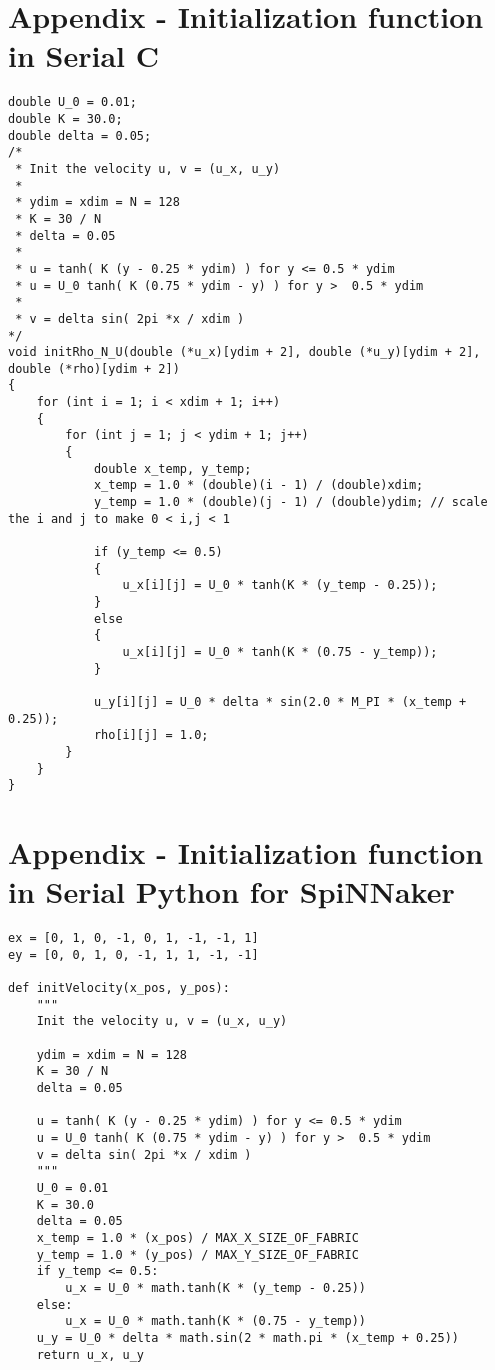 \appendix
\section{Appendix - Initialization function in Serial C} \label{app:a}
\begin{verbatim}
double U_0 = 0.01;
double K = 30.0;
double delta = 0.05;
/*
 * Init the velocity u, v = (u_x, u_y)
 * 
 * ydim = xdim = N = 128
 * K = 30 / N
 * delta = 0.05
 * 
 * u = tanh( K (y - 0.25 * ydim) ) for y <= 0.5 * ydim 
 * u = U_0 tanh( K (0.75 * ydim - y) ) for y >  0.5 * ydim
 * 
 * v = delta sin( 2pi *x / xdim )
*/
void initRho_N_U(double (*u_x)[ydim + 2], double (*u_y)[ydim + 2], double (*rho)[ydim + 2])
{
    for (int i = 1; i < xdim + 1; i++)
    {
        for (int j = 1; j < ydim + 1; j++)
        {
            double x_temp, y_temp;
            x_temp = 1.0 * (double)(i - 1) / (double)xdim;
            y_temp = 1.0 * (double)(j - 1) / (double)ydim; // scale the i and j to make 0 < i,j < 1

            if (y_temp <= 0.5)
            {
                u_x[i][j] = U_0 * tanh(K * (y_temp - 0.25));
            }
            else
            {
                u_x[i][j] = U_0 * tanh(K * (0.75 - y_temp));
            }

            u_y[i][j] = U_0 * delta * sin(2.0 * M_PI * (x_temp + 0.25));
            rho[i][j] = 1.0;
        }
    }
}
\end{verbatim}
\newpage
\section{Appendix - Initialization function in Serial Python for SpiNNaker} \label{app:b}
\begin{verbatim}
ex = [0, 1, 0, -1, 0, 1, -1, -1, 1]
ey = [0, 0, 1, 0, -1, 1, 1, -1, -1]

def initVelocity(x_pos, y_pos):
    """
    Init the velocity u, v = (u_x, u_y)
  
    ydim = xdim = N = 128
    K = 30 / N
    delta = 0.05
  
    u = tanh( K (y - 0.25 * ydim) ) for y <= 0.5 * ydim 
    u = U_0 tanh( K (0.75 * ydim - y) ) for y >  0.5 * ydim
    v = delta sin( 2pi *x / xdim )
    """
    U_0 = 0.01
    K = 30.0
    delta = 0.05
    x_temp = 1.0 * (x_pos) / MAX_X_SIZE_OF_FABRIC
    y_temp = 1.0 * (y_pos) / MAX_Y_SIZE_OF_FABRIC
    if y_temp <= 0.5:
        u_x = U_0 * math.tanh(K * (y_temp - 0.25))
    else:
        u_x = U_0 * math.tanh(K * (0.75 - y_temp))
    u_y = U_0 * delta * math.sin(2 * math.pi * (x_temp + 0.25))
    return u_x, u_y
\end{verbatim}